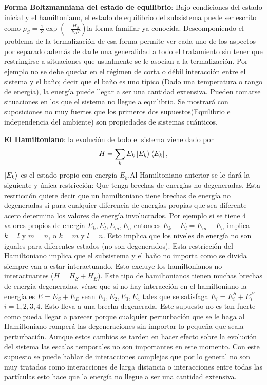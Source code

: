 \textbf{Forma Boltzmanniana del estado de equilibrio}: Bajo condiciones del estado inicial y el hamiltoniano, el estado de equilibrio del subsistema puede ser escrito como $\rho_{S}= \frac{1}{Z} \exp(-\frac{H_{S}}{k_{B}T})$la forma familiar ya conocida.
Descomponiendo el problema de la termalización de esa forma permite ver cada uno de los aspectos por separado además de darle una generalidad a todo el tratamiento sin tener que restringirse a situaciones que usualmente se le asocian a la termalización. Por ejemplo no se debe quedar en el régimen de corta o débil interacción entre el sistema y el baño; decir que el baño es uno típico (Dado una temperatura o rango de energía), la energía puede llegar a ser una cantidad extensiva. Pueden tomarse situaciones en los que el sistema no llegue a equilibrio.
Se mostrará con suposiciones no muy fuertes que los primeros dos supuestos(Equilibrio e independencia del ambiente) son propiedades de sistemas cuánticos.



\textbf{El Hamiltoniano}: la evolución de todo el sistema viene dado por 
\begin{equation}
H= \sum_{k} E_{k} \ket{E_{k}} \bra{E_{k}},
\end{equation}
$\ket{E_{k}}$ es el estado propio con energía $E_{k}$.Al Hamiltoniano anterior se le dará la siguiente y única restricción: Que tenga brechas de energías no degeneradas. Esta restricción quiere decir que  un hamiltoniano tiene brechas de energía no degeneradas si para cualquier diferencia de energías propias que sea diferente acero determina los valores de energía involucrados. Por ejemplo si se tiene 4 valores propios de energía $E_{k}, E_{l},E_{m},E_{n}$ entonces $E_{k}-E_{l}=E_{m}-E_{n} $ implica $k=l$ y $m=n$, o $k=m$ y $l=n$. Esto implica que los niveles de energía no son iguales para diferentes estados (no son degenerados).
Esta restricción del Hamiltoniano implica que el subsistema y el baño no importa como se divida siempre van a estar interactuando. Esto excluye los hamiltonianos no interactuantes ($H=H_{S}+H_{E}$). Este tipo de hamiltonianos tienen muchas brechas de energía degeneradas. véase que si no hay interacción en el hamiltoniano la energía es $E=E_{S}+E_{E}$ sean $E_{1},E_{2},E_{3},E_{4}$ tales que se satisfaga $E_{i}=E_{i}^{S}+E_{i}^{E}$ $i=1,2,3,4$. Esto lleva a una brecha degenerada. Este supuesto no es tan fuerte como pueda llegar a parecer porque cualquier perturbación que se le haga al Hamiltoniano romperá las degeneraciones sin importar lo pequeña que seala perturbación. Aunque estos cambios se tarden en hacer efecto sobre la evolución del sistema las escalas temporales no son importantes en este momento. Con este supuesto se puede hablar de interacciones complejas que por lo general no son muy tratados como interacciones de larga distancia o interacciones entre todas las partículas esto hace que la energía no llegue a ser una cantidad extensiva.


